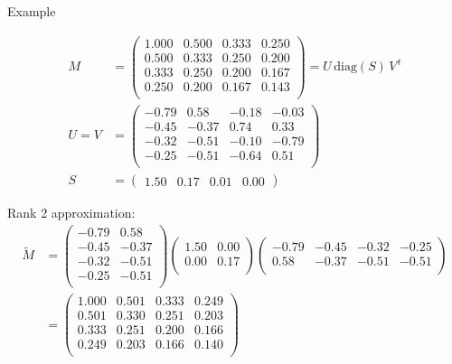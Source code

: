 \documentclass[11pt,ignorenonframetext,]{beamer}
\begin{document}
\begin{frame}{Example}
\protect\hypertarget{example}{}

\footnotesize

\[ \begin{aligned}
M 
&= \begin{pmatrix}
  1.000 & 0.500 & 0.333 & 0.250 \\ 
  0.500 & 0.333 & 0.250 & 0.200 \\ 
  0.333 & 0.250 & 0.200 & 0.167 \\ 
  0.250 & 0.200 & 0.167 & 0.143 \\ 
\end{pmatrix} 
  = U \, \text{diag}(S) \, V^{\,t} \\
U = V &= \begin{pmatrix}
  -0.79 & 0.58 & -0.18 & -0.03 \\ 
  -0.45 & -0.37 & 0.74 & 0.33 \\ 
  -0.32 & -0.51 & -0.10 & -0.79 \\ 
  -0.25 & -0.51 & -0.64 & 0.51 \\ 
  \end{pmatrix} \\
S &= 
\begin{pmatrix} 1.50 & 0.17  & 0.01 & 0.00 \end{pmatrix}
\end{aligned} \]

\pause

\normalsize

Rank 2 approximation: \footnotesize \[ \begin{aligned}
\tilde M
&= \begin{pmatrix}
  -0.79 &  0.58 \\ 
  -0.45 & -0.37 \\ 
  -0.32 & -0.51 \\ 
  -0.25 & -0.51 \\ 
\end{pmatrix}
\begin{pmatrix}
  1.50 & 0.00 \\ 
  0.00 & 0.17 \\ 
\end{pmatrix}
\begin{pmatrix}
  -0.79 & -0.45 & -0.32 & -0.25 \\ 
  0.58 & -0.37 & -0.51 & -0.51 \\ 
\end{pmatrix} \\
&= 
\begin{pmatrix}
  1.000 & 0.501 & 0.333 & 0.249 \\ 
  0.501 & 0.330 & 0.251 & 0.203 \\ 
  0.333 & 0.251 & 0.200 & 0.166 \\ 
  0.249 & 0.203 & 0.166 & 0.140 \\ 
\end{pmatrix}
\end{aligned} \]

\end{frame}
\end{document}
